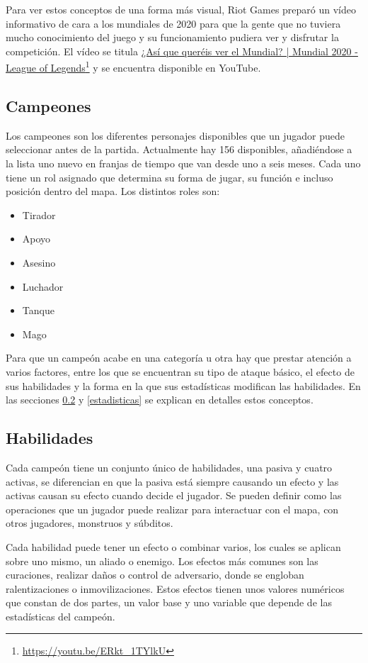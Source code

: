 Para ver estos conceptos de una forma más visual, Riot Games preparó un vídeo informativo de cara a los mundiales de 2020 para que la gente que no tuviera mucho conocimiento del juego y su funcionamiento pudiera ver y disfrutar la competición. El vídeo se titula \href{https://www.youtube.com/watch?v=ERkt_1TYlkU}{¿Así que queréis ver el Mundial? | Mundial 2020 - League of Legends}\footnote{\url{https://youtu.be/ERkt_1TYlkU}} y se encuentra disponible en YouTube.


\subsection{Campeones}
Los campeones son los diferentes personajes disponibles que un jugador puede seleccionar antes de la partida. Actualmente hay 156 disponibles, añadiéndose a la lista uno nuevo en franjas de tiempo que van desde uno a seis meses. Cada uno tiene un rol asignado que determina su forma de jugar, su función e incluso posición dentro del mapa. Los distintos roles son:
\begin{itemize}
	\tightlist
	\item Tirador
	\item Apoyo
	\item Asesino
	\item Luchador
	\item Tanque
	\item Mago
\end{itemize}

Para que un campeón acabe en una categoría u otra hay que prestar atención a varios factores, entre los que se encuentran su tipo de ataque básico, el efecto de sus habilidades y la forma en la que sus estadísticas modifican las habilidades. En las secciones \ref{habilidades} y \ref{estadisticas} se explican en detalles estos conceptos.

\subsection{Habilidades}
\label{habilidades}
Cada campeón tiene un conjunto único de habilidades, una pasiva y cuatro activas, se diferencian en que la pasiva está siempre causando un efecto y las activas causan su efecto cuando decide el jugador. Se pueden definir como las operaciones que un jugador puede realizar para interactuar con el mapa, con otros jugadores, monstruos y súbditos.

Cada habilidad puede tener un efecto o combinar varios, los cuales se aplican sobre uno mismo, un aliado o enemigo. Los efectos más comunes son las curaciones, realizar daños o control de adversario, donde se engloban ralentizaciones o inmovilizaciones. Estos efectos tienen unos valores numéricos que constan de dos partes, un valor base y uno variable que depende de las estadísticas del campeón.

